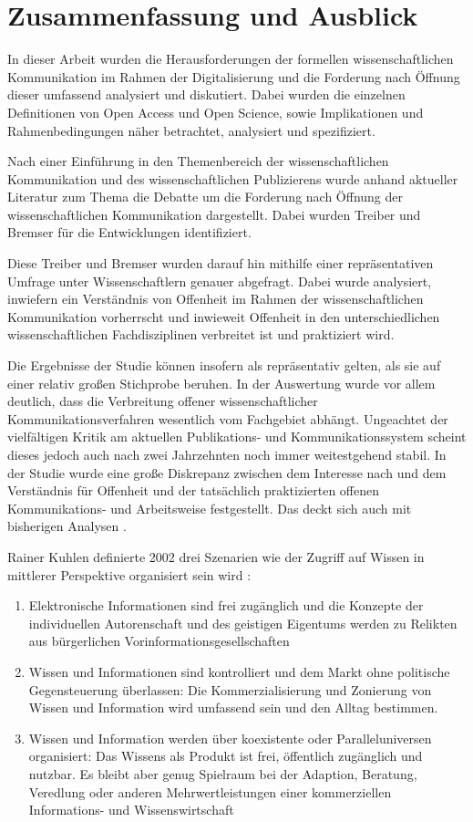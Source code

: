 \chapter{Zusammenfassung und Ausblick}

In dieser Arbeit wurden die Herausforderungen der formellen wissenschaftlichen Kommunikation im Rahmen der Digitalisierung und die Forderung nach Öffnung dieser umfassend analysiert und diskutiert. Dabei wurden die einzelnen Definitionen von Open Access und Open Science, sowie Implikationen und Rahmenbedingungen näher betrachtet, analysiert und spezifiziert.

Nach einer Einführung in den Themenbereich der wissenschaftlichen Kommunikation und des wissenschaftlichen Publizierens wurde anhand aktueller Literatur zum Thema die Debatte um die Forderung nach Öffnung der wissenschaftlichen Kommunikation dargestellt. Dabei wurden Treiber und Bremser für die Entwicklungen identifiziert.

Diese Treiber und Bremser wurden darauf hin mithilfe einer repräsentativen Umfrage unter Wissenschaftlern genauer abgefragt. Dabei wurde analysiert, inwiefern ein Verständnis von Offenheit im Rahmen der wissenschaftlichen Kommunikation vorherrscht und inwieweit Offenheit in den unterschiedlichen wissenschaftlichen Fachdisziplinen verbreitet ist und praktiziert wird.

Die Ergebnisse der Studie können insofern als repräsentativ gelten, als sie auf einer relativ großen Stichprobe beruhen. In der Auswertung wurde vor allem deutlich, dass die Verbreitung offener wissenschaftlicher Kommunikationsverfahren wesentlich vom Fachgebiet abhängt. Ungeachtet der vielfältigen Kritik am aktuellen Publikations- und Kommunikationssystem scheint dieses jedoch auch nach zwei Jahrzehnten noch immer weitestgehend stabil. In der Studie wurde eine große Diskrepanz zwischen dem Interesse nach und dem Verständnis für Offenheit und der tatsächlich praktizierten offenen Kommunikations- und Arbeitsweise festgestellt. Das deckt sich auch mit bisherigen Analysen \cite{Bartling_2013} \cite{hagner_2015_sache_buches}.

Rainer Kuhlen definierte 2002 drei Szenarien wie der Zugriff auf Wissen in mittlerer Perspektive organisiert sein wird \cite{Kuhlen_2002_universalaccess}:
\begin{enumerate}
\item Elektronische Informationen sind frei zugänglich und die Konzepte der individuellen Autorenschaft und des geistigen Eigentums werden zu Relikten aus bürgerlichen Vorinformationsgesellschaften
\item Wissen und Informationen sind kontrolliert und dem Markt ohne politische Gegensteuerung überlassen: Die Kommerzialisierung und Zonierung von Wissen und Information wird umfassend sein und den Alltag bestimmen.
\item Wissen und Information werden über koexistente oder Paralleluniversen organisiert: Das Wissens als Produkt ist frei, öffentlich zugänglich und nutzbar. Es bleibt aber genug Spielraum bei der Adaption, Beratung, Veredlung oder anderen Mehrwertleistungen einer kommerziellen Informations- und Wissenswirtschaft
\end{enumerate}

